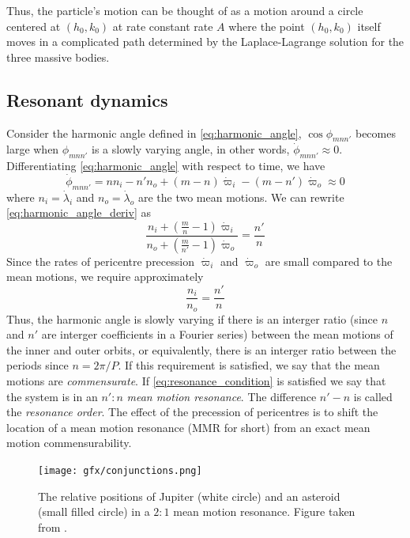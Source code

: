 Thus, the particle's motion can be thought of as a motion around 
a circle centered at $(h_0,k_0)$ at rate constant rate $A$ where
the point $(h_0,k_0)$ itself moves in a complicated path determined
by the Laplace-Lagrange solution for the three massive bodies. 

\subsection{Resonant dynamics}
\label{sub:Resonant_dynamics}
Consider the harmonic angle defined in \cref{eq:harmonic_angle}, 
$\cos\phi_{mnn'}$ becomes large when $\phi_{mnn'}$ is a slowly
varying angle, in other words, $\dot{\phi}_{mnn'}\approx 0$. 
Differentiating \cref{eq:harmonic_angle} with respect to time,
we have
\begin{equation}
    \dot{\phi}_{mnn'}=nn_i-n'n_o+(m-n)\dot{\varpi}_i-(m-n')\dot{
        \varpi}_o\approx 0
    \label{eq:harmonic_angle_deriv}
\end{equation}
where $n_i=\dot{\lambda}_i$ and $n_o=\dot{\lambda}_o$ are the two
mean motions. We can rewrite \cref{eq:harmonic_angle_deriv} as
\begin{equation}
    \frac{n_i+( \frac{m}{n} -1)\dot{\varpi}_i}
    {n_o + ( \frac{m}{n'}-1)\dot{\varpi}_o } 
    = \frac{n'}{n} 
    \label{eq:resonance_condition}
\end{equation}
Since the rates of pericentre precession $\dot{\varpi}_i$ 
and $\dot{\varpi}_o$ are small compared to the mean motions, we
require approximately
\begin{equation}
    \frac{n_i}{n_o} = \frac{n'}{n} 
\end{equation}
Thus, the harmonic angle is slowly varying if there is an interger 
ratio (since $n$ and $n'$ are interger coefficients in a Fourier 
series) between the mean motions of
the inner and outer orbits, or equivalently, there is an interger
ratio between the periods since $n=2\pi/P$. If this 
requirement is satisfied, we say that the mean motions
are \emph{commensurate}. If \cref{eq:resonance_condition} is 
satisfied we say that the system is in an $n':n$ 
\emph{mean motion resonance}.
The difference $n'-n$ is called the \emph{resonance order}.
The effect of the precession of pericentres is to shift the location
of a mean motion resonance (MMR for short) from an exact 
mean motion commensurability.
\begin{figure}[htb]
\centering
    \texttt{[image: gfx/conjunctions.png]}
    \caption{The relative positions of Jupiter (white circle) and 
    an asteroid (small filled circle) in a $2:1$ mean motion
    resonance. Figure taken from \cite{murray}.}
\label{fig:conjuctions}
\end{figure}

